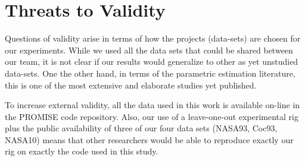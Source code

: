 \documentclass[smallcondesed]{svjour3}
\begin{document}
\section{Threats to Validity}









Questions of validity arise in terms of how the
projects (data-sets) are chosen for our experiments.
While we used all the data sets that could be shared
between our team, it is not clear if our results
would generalize to other as yet unstudied
data-sets. One the other hand, in terms of the
parametric estimation literature, this is one of the most extensive
and elaborate studies yet published.

To increase external
validity, all the data used in this work is available
on-line in the PROMISE code repository. Also, our use of a leave-one-out experimental rig
plus the public availability of three of our four data sets (NASA93, Coc93, NASA10)
means that other researchers would be able to reproduce exactly
our rig on exactly the code used in this study.
\end{document}
